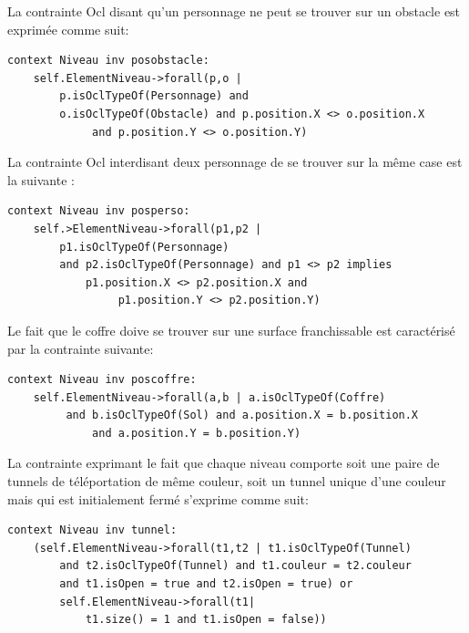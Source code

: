 \newpage

La contrainte Ocl disant qu'un personnage ne peut se trouver sur un obstacle est exprimée comme suit:

\begin{lstlisting}[caption=Contrainte sur la position,captionpos=b,label={lst:positionobstacle},language=OCL]
context Niveau inv posobstacle:
    self.ElementNiveau->forall(p,o | 
        p.isOclTypeOf(Personnage) and 
        o.isOclTypeOf(Obstacle) and p.position.X <> o.position.X
             and p.position.Y <> o.position.Y)
\end{lstlisting}

La contrainte Ocl interdisant deux personnage de se trouver sur la même case est la suivante :

\begin{lstlisting}[caption=Contrainte sur l'interdiction de deux personnages sur la même case,captionpos=b,label={lst:interdiction},language=OCL]
context Niveau inv posperso:
    self.>ElementNiveau->forall(p1,p2 | 
        p1.isOclTypeOf(Personnage) 
        and p2.isOclTypeOf(Personnage) and p1 <> p2 implies 
            p1.position.X <> p2.position.X and
                 p1.position.Y <> p2.position.Y)
\end{lstlisting}

Le fait que le coffre doive se trouver sur une surface franchissable est caractérisé par la contrainte suivante:

\begin{lstlisting}[caption=Contrainte sur la position du coffre,captionpos=b,label={lst:poscoffre},language=OCL]
context Niveau inv poscoffre:
    self.ElementNiveau->forall(a,b | a.isOclTypeOf(Coffre)
         and b.isOclTypeOf(Sol) and a.position.X = b.position.X
             and a.position.Y = b.position.Y)
\end{lstlisting}

La contrainte exprimant le fait que chaque niveau comporte soit une paire de tunnels de téléportation de même couleur, soit un tunnel unique d'une couleur mais qui est initialement fermé s'exprime comme suit:

\begin{lstlisting}[caption=Contrainte sur les tunnels,captionpos=b,label={lst:tunnels},language=OCL]
context Niveau inv tunnel:
    (self.ElementNiveau->forall(t1,t2 | t1.isOclTypeOf(Tunnel) 
        and t2.isOclTypeOf(Tunnel) and t1.couleur = t2.couleur 
        and t1.isOpen = true and t2.isOpen = true) or 
        self.ElementNiveau->forall(t1| 
            t1.size() = 1 and t1.isOpen = false))
\end{lstlisting}

